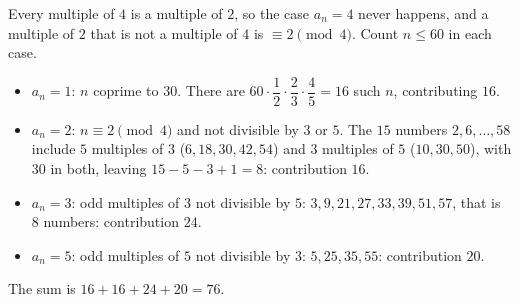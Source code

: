 Every multiple of $4$ is a multiple of $2$, so the case $a_n=4$ never happens, and a multiple of $2$ that is not a multiple of $4$ is $\equiv2\pmod4$. Count $n\le60$ in each case.
\begin{itemize}
\item $a_n=1$: $n$ coprime to $30$. There are $60\cdot\dfrac{1}{2}\cdot\dfrac{2}{3}\cdot\dfrac{4}{5}=16$ such $n$, contributing $16$.
\item $a_n=2$: $n\equiv2\pmod4$ and not divisible by $3$ or $5$. The $15$ numbers $2,6,\dots,58$ include $5$ multiples of $3$ ($6,18,30,42,54$) and $3$ multiples of $5$ ($10,30,50$), with $30$ in both, leaving $15-5-3+1=8$: contribution $16$.
\item $a_n=3$: odd multiples of $3$ not divisible by $5$: $3,9,21,27,33,39,51,57$, that is $8$ numbers: contribution $24$.
\item $a_n=5$: odd multiples of $5$ not divisible by $3$: $5,25,35,55$: contribution $20$.
\end{itemize}
The sum is $16+16+24+20=\boxed{76}$.
